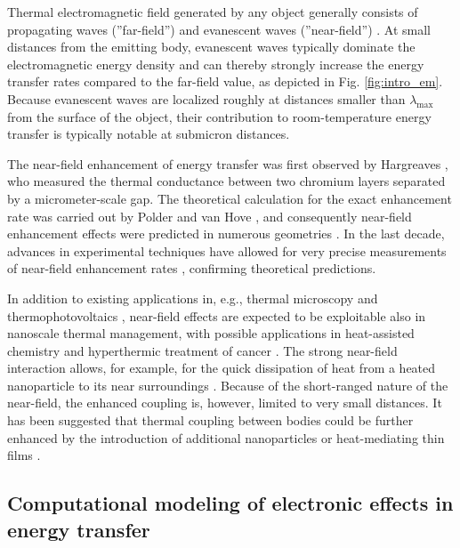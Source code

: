 Thermal electromagnetic field generated by any object generally consists of propagating waves (''far-field'') and evanescent waves (''near-field'') \cite{novotny}. At small distances from the emitting body, evanescent waves typically dominate the electromagnetic energy density and can thereby strongly increase the energy transfer rates compared to the far-field value, as depicted in Fig. \ref{fig:intro_em}. Because evanescent waves are localized roughly at distances smaller than $\lambda_{\textrm{max}}$ from the surface of the object, their contribution to room-temperature energy transfer is typically notable at submicron distances.

The near-field enhancement of energy transfer was first observed by Hargreaves \cite{hargreaves69}, who measured the thermal conductance between two chromium layers separated by a micrometer-scale gap. The theoretical calculation for the exact enhancement rate was carried out by Polder and van Hove \cite{polder71}, and consequently near-field enhancement effects were predicted in numerous geometries \cite{loomis94,pendry99,carminati99,shchegrov00,mulet01,volokitin01}. In the last decade, advances in experimental techniques have allowed for very precise measurements of near-field enhancement rates \cite{kittel05,hu08,shen09,ottens11}, confirming theoretical predictions. 

In addition to existing applications in, e.g., thermal microscopy \cite{majumdar99,muller-hirsch99,kittel05,kittel08} and thermophotovoltaics \cite{dimatteo01,narayanaswamy03,laroche06}, near-field effects are expected to be exploitable also in nanoscale thermal management, with possible applications in heat-assisted chemistry \cite{cao07,adleman09} and hyperthermic treatment of cancer \cite{vanderzee02}. The strong near-field interaction allows, for example, for the quick dissipation of heat from a heated nanoparticle to its near surroundings \cite{mulet01,domingues05}. Because of the short-ranged nature of the near-field, the enhanced coupling is, however, limited to very small distances. It has been suggested that thermal coupling between bodies could be further enhanced by the introduction of additional nanoparticles  \cite{benabdallah11,messina13} or heat-mediating thin films \cite{zheng11,messina12}. 

\subsection{Computational modeling of electronic effects in energy transfer}
\label{sec:intro_electrons}

